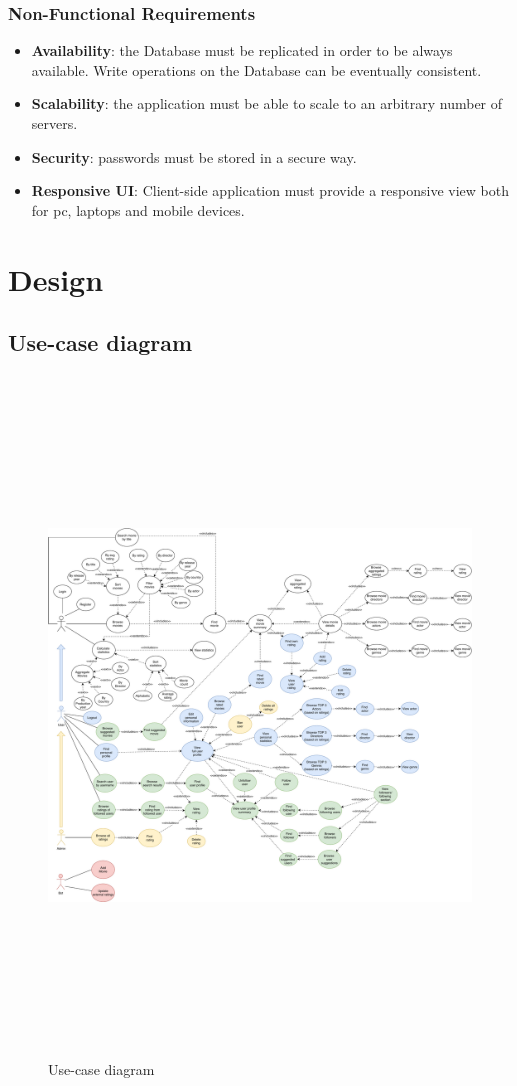 \documentclass[11pt]{article}
\begin{document}
\subsubsection{Non-Functional Requirements}
\begin{itemize}
	\item \textbf{Availability}: the Database must be replicated in order to be always available.
	Write operations on the Database can be eventually consistent.
	\item \textbf{Scalability}: the application must be able to scale to an arbitrary number of servers.
	\item \textbf{Security}: passwords must be stored in a secure way.
	\item \textbf{Responsive UI}: Client-side application must provide a responsive view both for pc, 
	laptops and mobile devices.
\end{itemize}

\section{Design}

\subsection{Use-case diagram}

\begin{figure}
    \centering
    \includegraphics[height=18cm]{figs/use_case.pdf}
    \caption{Use-case diagram}
    \label{fig:usecase}
\end{figure}
\end{document}
